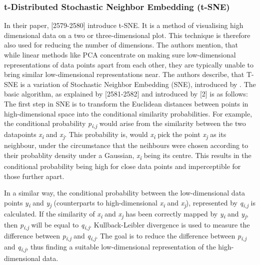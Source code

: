 \subsubsection{t-Distributed Stochastic Neighbor Embedding (t-SNE)}
In their paper, \textcite{maaten2008visualizing}[2579-2580] introduce t-SNE. It is a method of visualising high dimensional data on a two or three-dimensional plot. This technique is therefore also used for reducing the number of dimensions. The authors mention, that while linear methods like PCA concentrate on making sure low-dimensional representations of data points apart from each other, they are typically unable to bring similar low-dimensional representations near.
The authors describe, that T-SNE is a variation of Stochastic Neighbor Embedding (SNE), introduced by \textcite{hinton2003stochastic}. The basic algorithm, as explained by \textcite{maaten2008visualizing}[2581-2582] and introduced by \textcite{hinton2003stochastic}[2] is as follows:
The first step in SNE is to transform the Euclidean distances between points in high-dimensional space into the conditional similarity probabilities. For example, the conditional probability \textit{p\textsubscript{i,j}} would arise from the similarity between the two datapoints \textit{x\textsubscript{i}} and \textit{x\textsubscript{j}}. This probability is, would \textit{x\textsubscript{i}} pick the point \textit{x\textsubscript{j}} as its neighbour, under the circumstance that the neihbours were chosen according to their probablity density under a Gaussian, \textit{x\textsubscript{i}} being its centre.
This results in the conditional probability being high for close data points and imperceptible for those further apart.

In a similar way, the conditional probability between the low-dimensional data points \textit{y\textsubscript{i}} and \textit{y\textsubscript{j}} (counterparts to high-dimensional \textit{x\textsubscript{i}} and \textit{x\textsubscript{j}}), represented by \textit{q\textsubscript{i,j}} is calculated. If the similarity of \textit{x\textsubscript{i}} and \textit{x\textsubscript{j}} has been correctly mapped by \textit{y\textsubscript{i}} and \textit{y\textsubscript{j}}, then \textit{p\textsubscript{i,j}} will be equal to \textit{q\textsubscript{i,j}}. Kullback-Leibler divergence is used to measure the difference between \textit{p\textsubscript{i,j}} and \textit{q\textsubscript{i,j}}. The goal is to reduce the difference between \textit{p\textsubscript{i,j}} and \textit{q\textsubscript{i,j}}, thus finding a suitable low-dimensional representation of the high-dimensional data.


